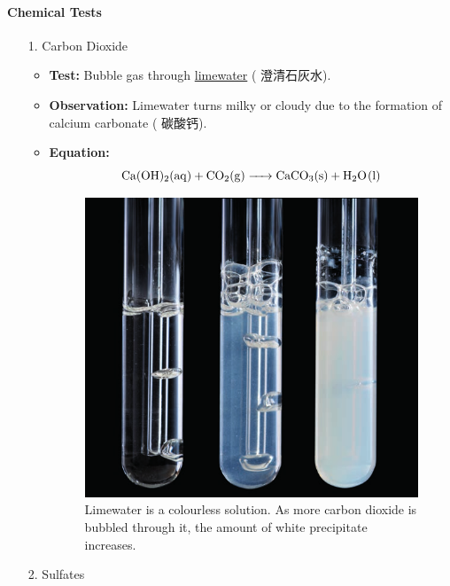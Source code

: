 \paragraph{Chemical Tests}
\begin{itemize}
    \item[1.] Carbon Dioxide
    \begin{itemize}
        \item \textbf{Test:} Bubble  gas through \underline{limewater} ( 澄清石灰水).
        \item \textbf{Observation:} Limewater turns milky or cloudy due to the formation of calcium carbonate ( 碳酸钙).
        \item \textbf{Equation:}
        \begin{equation}
            \ce{Ca(OH)2(aq) + CO2(g) -> CaCO3(s) + H2O(l)}
        \end{equation}
        \begin{figure}[H]
            \centering
            \includegraphics[scale=0.5]{Chemistry/1B/Images/1B-4-1.bmp}
            \caption{ Limewater is a colourless solution. As more carbon dioxide is bubbled through it, the amount of white
            precipitate increases.}
        \end{figure}
    \end{itemize}
    \item[2.] Sulfates
    \begin{itemize}

\end{itemize}
\end{itemize}
